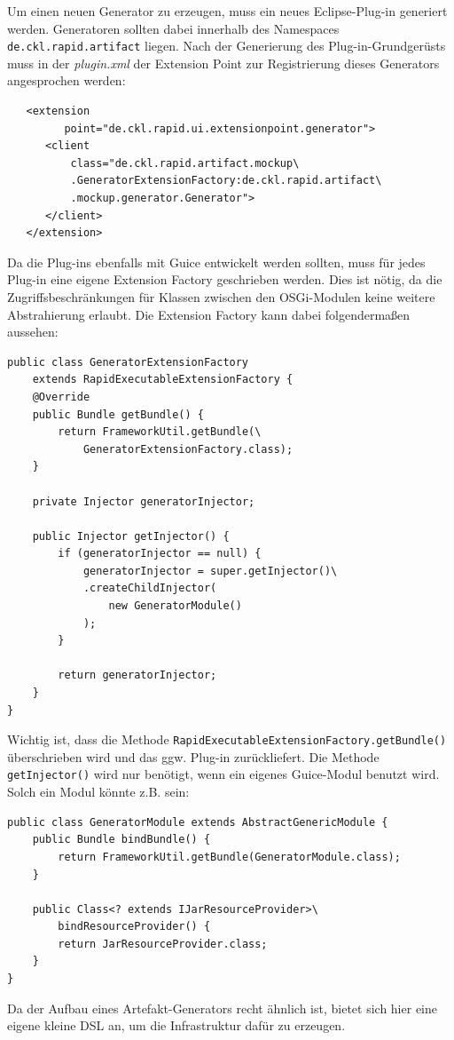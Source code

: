 \documentclass[a4paper,12pt]{scrreprt}
\begin{document}
Um einen neuen Generator zu erzeugen, muss ein neues Eclipse-Plug-in generiert werden. Generatoren sollten dabei innerhalb des Namespaces \verb+de.ckl.rapid.artifact+ liegen.
Nach der Generierung des Plug-in-Grundgerüsts muss in der \emph{plugin.xml} der Extension Point zur Registrierung dieses Generators angesprochen werden:
\begin{verbatim}
   <extension
         point="de.ckl.rapid.ui.extensionpoint.generator">
      <client
          class="de.ckl.rapid.artifact.mockup\
          .GeneratorExtensionFactory:de.ckl.rapid.artifact\
          .mockup.generator.Generator">
      </client>
   </extension>
\end{verbatim}
Da die Plug-ins ebenfalls mit Guice entwickelt werden sollten, muss für jedes Plug-in eine eigene Extension Factory geschrieben werden. Dies ist nötig, da die Zugriffsbeschränkungen für Klassen zwischen den OSGi-Modulen keine weitere Abstrahierung erlaubt.
Die Extension Factory kann dabei folgendermaßen aussehen:
\begin{verbatim}
public class GeneratorExtensionFactory 
    extends RapidExecutableExtensionFactory {
    @Override
    public Bundle getBundle() {
        return FrameworkUtil.getBundle(\
            GeneratorExtensionFactory.class);	
    }

    private Injector generatorInjector;

    public Injector getInjector() {
        if (generatorInjector == null) {
            generatorInjector = super.getInjector()\
            .createChildInjector(
                new GeneratorModule()
            );
        }

        return generatorInjector;
    }
}\end{verbatim}
Wichtig ist, dass die Methode \texttt{RapidExecutableExtensionFactory.getBundle()} überschrieben wird und das ggw. Plug-in zurückliefert. Die Methode \texttt{getInjector()} wird nur benötigt, wenn ein eigenes Guice-Modul benutzt wird. Solch ein Modul könnte z.B. sein:
\begin{verbatim}
public class GeneratorModule extends AbstractGenericModule {
    public Bundle bindBundle() {
        return FrameworkUtil.getBundle(GeneratorModule.class);
    }

    public Class<? extends IJarResourceProvider>\
        bindResourceProvider() {
        return JarResourceProvider.class;
    }
}
\end{verbatim}
Da der Aufbau eines Artefakt-Generators recht ähnlich ist, bietet sich hier eine eigene kleine DSL an, um die Infrastruktur dafür zu erzeugen.
\end{document}
